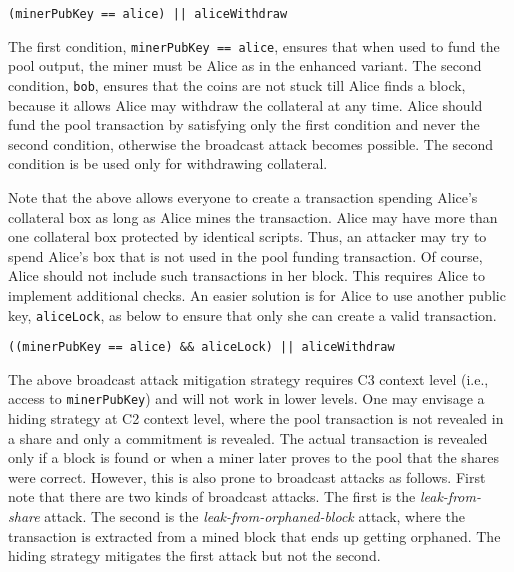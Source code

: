 \documentclass{llncs}
\begin{document}
\begin{verbatim}
(minerPubKey == alice) || aliceWithdraw
\end{verbatim}

The first condition, \texttt{minerPubKey == alice}, ensures that when used to fund the pool output, the miner must be Alice as in the enhanced variant. The second condition, \texttt{bob}, ensures that the coins are not stuck till Alice finds a block, because it allows Alice may withdraw the collateral at any time.
Alice should fund the pool transaction by satisfying only the first condition and never the second condition, otherwise the broadcast attack becomes possible. The second condition is be used only for withdrawing collateral.

Note that the above allows everyone to create a transaction spending Alice's collateral box as long as Alice mines the transaction. Alice may have more than one collateral box protected by identical scripts. Thus, an attacker may try to spend Alice's box that is not used in the pool funding transaction. Of course, Alice should not include such transactions in her block. This requires Alice to implement additional checks. An easier solution is for Alice to use another public key, \texttt{aliceLock}, as below to ensure that only she can create a valid transaction. 

\begin{verbatim}
((minerPubKey == alice) && aliceLock) || aliceWithdraw
\end{verbatim}

The above broadcast attack mitigation strategy requires C3 context level (i.e., access to \texttt{minerPubKey}) and will not work in lower levels. One may envisage a hiding strategy at C2 context level, where the pool transaction is not revealed in a share and only a commitment is revealed. The actual transaction is revealed only if a block is found or when a miner later proves to the pool that the shares were correct. However, this is also prone to broadcast attacks as follows. First note that there are two kinds of broadcast attacks. The first is the {\em leak-from-share} attack. The second is the {\em leak-from-orphaned-block} attack, where the transaction is extracted from a mined block that ends up getting orphaned. The hiding strategy mitigates the first attack but not the second.
\end{document}
